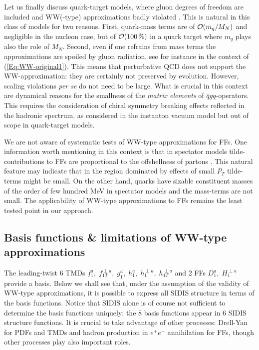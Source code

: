 \documentclass[a4paper,11pt]{article}
\begin{document}
Let us finally discuss quark-target models, 
where gluon degrees of freedom are included and WW(-type)
approximations badly violated
\cite{Kundu:2001pk,Schlegel:2004rg,Meissner:2007rx,Mukherjee:2009uy}.
This is natural in this class of models for two
reasons. First, quark-mass terms are of ${\cal O}(m_q/M_N)$ 
and negligible in the nucleon case, but of ${\cal O}(100\,\%)$
in a quark target where $m_q$ plays also the role of $M_N$. 
Second, even if one refrains from mass terms the approximations are 
spoiled by gluon radiation, see for instance \cite{Harindranath:1997qn} 
in the context of (\ref{Eq:WW-original1}).
This means that perturbative QCD does not support the WW-approximation:
they are certainly not preserved by evolution. However, scaling violations
{\it per se} do not need to be large. What is crucial in this context are 
dynamical reasons for the smallness of the {\sl matrix elements} of
$\bar qgq$-operators. This requires the consideration of chiral symmetry 
breaking effects reflected in the hadronic spectrum, as considered in the
instanton vacuum model \cite{Balla:1997hf,Dressler:1999hc} but 
out of scope in quark-target models.

We are not aware of systematic tests of WW-type approximations for FFs. One 
information worth mentioning in this context is that in spectator models 
\cite{Jakob:1997wg} tilde-contributions to FFs are proportional to the 
offshellness of partons %
\cite{Lorce:2014hxa,Lorce:2016ugb}. This
natural feature may indicate that in the region dominated by effects of
small $P_T$ tilde-terms might be small. On the other hand, quarks have 
sizable constituent masses of the order of few hundred MeV in spectator models 
and the mass-terms are not small. 
The applicability of WW-type approximations to FFs 
remains the least tested point in our approach.




\subsection{Basis functions \& limitations of WW-type approximations}
\label{Sec-3.7:basis+limitations}

The leading-twist 6 TMDs 
$f_1^a, \; f_{1T}^{\perp a}, \; g_1^a, \; h_1^a, \;h_1^{\perp a},\; h_{1T}^{\perp a}$
and 2 FFs $D_1^a, \; H_1^{\perp a}$ provide a basis.
Below we shall see that, under the assumption of the validity of WW-type 
approximations, it is possible to express all SIDIS structure
in terms of the basis functions. 
Notice that SIDIS alone is of course not sufficient to determine the basis
functions uniquely: the 8 basis functions appear in 6 SIDIS structure functions.
It is crucial to take advantage of other processes: Drell-Yan for PDFs and TMDs
and hadron production in $e^+e^-$ annihilation for FFs, though other processes 
play also important roles.
\end{document}
